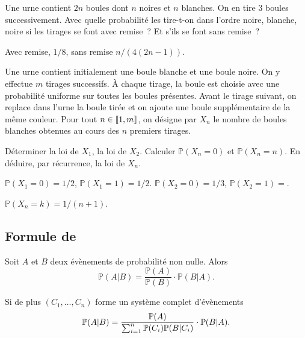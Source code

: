 \documentclass{magnolia}
\begin{document}
\begin{exos}
\exo Une urne contient $2n$ boules dont $n$ noires et $n$ blanches. On en tire 3 boules successivement. Avec quelle
  probabilité les tire-t-on dans l'ordre \og noire, blanche, noire \fg si les tirages se font avec remise~? Et s'ils
  se font sans remise~?
  \begin{sol}
  Avec remise, $1/8$, sans remise $n/(4(2n-1))$.
  \end{sol}
\exo Une urne contient initialement une boule blanche et une boule noire. On y effectue
  $m$ tirages successifs. À chaque tirage, la boule est choisie avec une probabilité
  uniforme sur toutes les boules présentes. Avant le tirage suivant, on replace dans l’urne
  la boule tirée et on ajoute une boule supplémentaire de la même couleur. Pour tout
  $n\in\left\llbracket 1,m\right\rrbracket$, on désigne par $X_n$ le nombre de boules blanches obtenues au cours
  des $n$ premiers tirages.
  \begin{questions}
  \question Déterminer la loi de $X_1$, la loi de $X_2$.
  \question Calculer $\mathbb{P}(X_n = 0)$ et $\mathbb{P}(X_n = n)$.
  \question En déduire, par récurrence, la loi de $X_n$.
  \end{questions}
\begin{sol}
\begin{questions}
\question $\mathbb{P}(X_1=0)=1/2$, $\mathbb{P}(X_1=1)=1/2$. $\mathbb{P}(X_2=0)=1/3$, $\mathbb{P}(X_2=1)=$.
\end{questions}
$\mathbb{P}(X_n=k)=1/(n+1)$.
\end{sol}
\end{exos}

\subsection{Formule de }

\begin{proposition}[nom={Formule de \nom{Bayes}}]
Soit $A$ et $B$ deux évènements de probabilité non nulle. Alors
\[\mathbb{P}(A|B)=\frac{\mathbb{P}(A)}{\mathbb{P}(B)}\cdot\mathbb{P}(B|A).\]
\end{proposition}

\begin{remarqueUnique}
\remarque Si de plus $(C_1,\ldots,C_n)$ forme un système complet d'évènements
  \[\mathbb{P}(A|B)=\frac{\mathbb{P}(A)}{%
    \sum_{i=1}^n \mathbb{P}(C_i)\mathbb{P}(B|C_i)}%
    \cdot\mathbb{P}(B|A).\]
\end{remarqueUnique}
\end{document}
